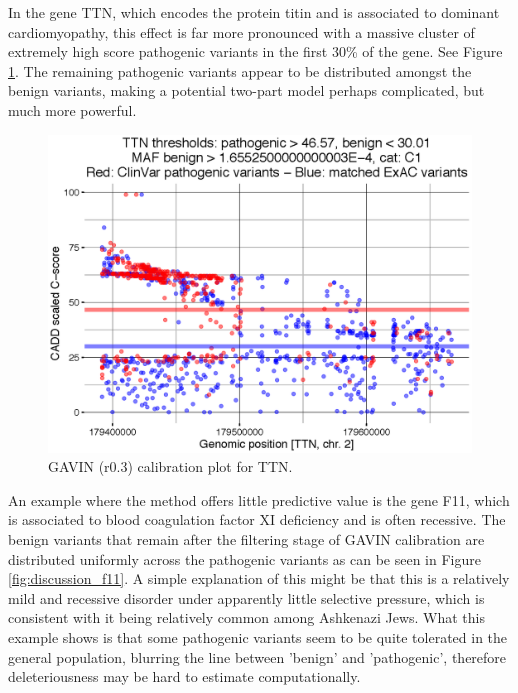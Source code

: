 In the gene TTN, which encodes the protein titin and is associated to dominant cardiomyopathy, this effect is far more pronounced with a massive cluster of extremely high score pathogenic variants in the first 30\% of the gene.
See Figure \ref{fig:discussion_ttn}.
The remaining pathogenic variants appear to be distributed amongst the benign variants, making a potential two-part model perhaps complicated, but much more powerful.

\begin{figure}
\centering
\includegraphics[scale=0.8]{img/discussion_ttn}
\caption{GAVIN (r0.3) calibration plot for TTN.}
\label{fig:discussion_ttn}
\end{figure}

An example where the method offers little predictive value is the gene F11, which is associated to blood coagulation factor XI deficiency and is often recessive.
The benign variants that remain after the filtering stage of GAVIN calibration are distributed uniformly across the pathogenic variants as can be seen in Figure \ref{fig:discussion_f11}.
A simple explanation of this might be that this is a relatively mild and recessive disorder under apparently little selective pressure, which is consistent with it being relatively common among Ashkenazi Jews\cite{Seligsohn1223}.
What this example shows is that some pathogenic variants seem to be quite tolerated in the general population, blurring the line between 'benign' and 'pathogenic', therefore deleteriousness may be hard to estimate computationally.

